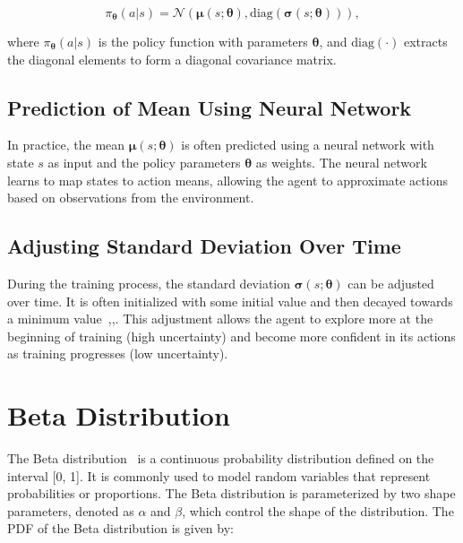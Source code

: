 \begin{equation}
    \pi_{\boldsymbol{\theta}}(a | s) = \mathcal{N}(\boldsymbol{\mu}(s; \boldsymbol{\theta}), \text{diag}(\boldsymbol{\sigma}(s; \boldsymbol{\theta}))),\label{eq:equation2}
\end{equation}

where $\pi_{\boldsymbol{\theta}}(a | s)$ is the policy function with parameters $\boldsymbol{\theta}$, and $\text{diag}(\cdot)$ extracts the diagonal elements to form a diagonal covariance matrix.

\subsection{Prediction of Mean Using Neural Network}\label{subsec:prediction-of-mean-using-neural-network}
In practice, the mean $\boldsymbol{\mu}(s; \boldsymbol{\theta})$ is often predicted using a neural network with state $s$ as input and the policy parameters $\boldsymbol{\theta}$ as weights.
The neural network learns to map states to action means, allowing the agent to approximate actions based on observations from the environment.

\subsection{Adjusting Standard Deviation Over Time}\label{subsec:adjusting-standard-deviation-over-time}
During the training process, the standard deviation $\boldsymbol{\sigma}(s; \boldsymbol{\theta})$ can be adjusted over time.
It is often initialized with some initial value and then decayed towards a minimum value~\cite{capasso2021endtoend},\cite{sutton2018reinforcement},\cite{mnih2015humanlevel}.
This adjustment allows the agent to explore more at the beginning of training (high uncertainty) and become more confident in its actions as training progresses (low uncertainty).

\section{Beta Distribution}\label{sec:beta-distribution}
The Beta distribution~ is a continuous probability distribution defined on the interval [0, 1].
It is commonly used to model random variables that represent probabilities or proportions.
The Beta distribution is parameterized by two shape parameters, denoted as $\alpha$ and $\beta$, which control the shape of the distribution. The PDF of the Beta distribution is given by:

